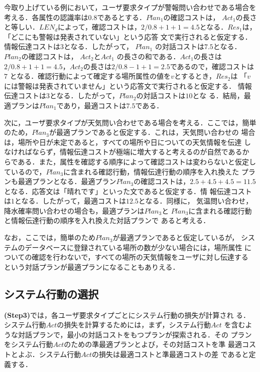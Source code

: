 今取り上げている例において，ユーザ要求タイプが警報問い合わせである場合を
考える．各属性の認識率は0.8であるとする．$Plan_{1}$の確認コストは，
$Act_{1}$の長さと等しい．$LEN_{d}$によって，確認コストは，$2/0.8 + 1 + 1
= 4.5$となる．$Res_{1}$は，「どこにも警報は発表されていない」という応答
文で実行されると仮定する．情報伝達コストは3となる．したがって，
$Plan_{1}$ の対話コストは$7.5$となる．$Plan_{2}$の確認コストは，
$Act_{2}$と$Act_{1}$ の長さの和である．$Act_{1}$の長さは$2/0.8 + 1 + 1 =
4.5$，$Act_{2}$の長さは$2/0.8 - 1 + 1 = 2.5$であるので，確認コストは$7$ 
となる．確認行動によって確定する場所属性の値を$v$とするとき，$Res_{2}$は
「$v$には警報は発表されていません」という応答文で実行されると仮定する．
情報伝達コストは$3$となる．したがって，$Plan_{2}$の対話コストは$10$とな
る．結局，最適プランは$Plan_{1}$であり，最適コストは$7.5$である．

次に，ユーザ要求タイプが天気問い合わせである場合を考える．ここでは，簡単
のため，$Plan_{3}$が最適プランであると仮定する．これは，天気問い合わせの
場合は，場所や日が未定であると，すべての場所や日についての天気情報を伝達
しなければならず，情報伝達コストが極端に増大すると考えるのが自然であるか
らである．また，属性を確認する順序によって確認コストは変わらないと仮定し
ているので，$Plan_{3}$に含まれる確認行動，情報伝達行動の順序を入れ換えた
プランも最適プランとなる．最適プラン$Plan_{3}$の確認コストは，$2.5 + 4.5
+ 4.5 = 11.5$となる．応答文は「晴れです」といった文であると仮定する．情
報伝達コストは$1$となる．したがって，最適コストは$12.5$となる．同様に，
気温問い合わせ，降水確率問い合わせの場合も，最適プランは$Plan_{3}$と
$Plan_{3}$に含まれる確認行動と情報伝達行動の順序を入れ換えた対話プランで
あると考える．

なお，ここでは，簡単のため$Plan_{3}$が最適プランであると仮定しているが，
システムのデータベースに登録されている場所の数が少ない場合には，場所属性
についての確認を行わないで，すべての場所の天気情報をユーザに対し伝達する
という対話プランが最適プランになることもありえる．

\subsection{システム行動の選択}

{\bf (Step3)}では，各ユーザ要求タイプごとにシステム行動の損失が計算され
る．システム行動$Act$の損失を計算するためには，まず，システム行動$Act$ 
を含むような対話プランで，最小の対話コストをもつプランが探索される．その
プランをシステム行動$Act$のための準最適プランとよび，その対話コストを準
最適コストとよぶ．システム行動$Act$の損失は最適コストと準最適コストの差
であると定義する．

